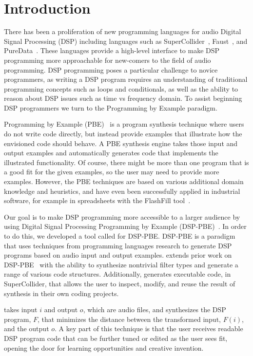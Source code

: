 
\section{Introduction}

There has been a proliferation of new programming languages for audio Digital Signal Processing (DSP) including languages such as SuperCollider~\cite{supercollider}, Faust~\cite{orlarey2009faust}, and PureData~\cite{puredata}.
These languages provide a high-level interface to make DSP programming more approachable for new-comers to the field of audio programming.
DSP programming poses a particular challenge to novice programmers, as writing a DSP program requires an understanding of traditional programming concepts such as loops and conditionals, as well as the ability to reason about DSP issues such as time vs frequency domain.
To assist beginning DSP programmers we turn to the Programming by Example paradigm.

Programming by Example (PBE)~\cite{cypher93,lieberman01} is a program synthesis technique 
where users do not write code directly, but instead provide examples that illustrate how the envisioned 
code should behave. A PBE synthesis engine takes those input and output examples and 
automatically generates code that implements the illustrated functionality. Of course, there might be more than
one program that is a good fit for the given examples, so the user may need to provide more examples.
However, the PBE techniques are based on various additional domain knowledge and heuristics, and have even been successfully applied in industrial software, for example in spreadsheets with the FlashFill tool~\cite{flashfill}.

Our goal is to make DSP programming more accessible to a larger audience by using Digital Signal Processing Programming by Example (DSP-PBE)~\cite{SantolucitoFARM}.
In order to do this, we developed a tool called \ourTool for DSP-PBE.
DSP-PBE is a paradigm that uses techniques from programming languages research to generate DSP programs based on audio input and output examples.
\ourTool extends prior work on DSP-PBE~\cite{SantolucitoFARM} with the ability to synthesize nontrivial filter types and generate a range of various code structures.
Additionally, \ourTool generates executable code, in SuperCollider, that allows the user to inspect, modify, and reuse the result of synthesis in their own coding projects.

\ourTool takes input $i$ and output $o$, which are audio files, and synthesizes the DSP program, $F$, that minimizes the distance between the transformed input, $F(i)$, and the output $o$.
A key part of this technique is that the user receives readable DSP program code that can be further tuned or edited as the user sees fit, opening the door for learning opportunities and creative invention.


